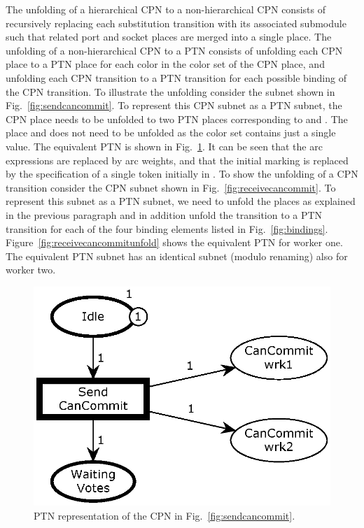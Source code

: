The unfolding of a hierarchical CPN to a non-hierarchical CPN consists
of recursively replacing each substitution transition with its
associated submodule such that related port and socket places are
merged into a single place. The unfolding of a non-hierarchical CPN to
a PTN consists of unfolding each CPN place to a PTN place for each
color in the color set of the CPN place, and unfolding each CPN
transition to a PTN transition for each possible binding of the CPN
transition.  To illustrate the unfolding consider the subnet shown in
Fig.~\ref{fig:sendcancommit}. To represent this CPN subnet as a PTN
subnet, the CPN place  needs to be unfolded to two
PTN places corresponding to  and . The
place  and  does not need to be
unfolded as the  color set contains just a single
value. The equivalent PTN is shown in
Fig.~\ref{fig:sendcancommitunfold}. It can be seen that the arc
expressions are replaced by arc weights, and that the initial marking
is replaced by the specification of a single token initially in
. To show the unfolding of a CPN transition consider the
CPN subnet shown in Fig.~\ref{fig:receivecancommit}. To represent this
subnet as a PTN subnet, we need to unfold the places as explained in
the previous paragraph and in addition unfold the transition
 to a PTN transition for each of the four
binding elements listed in
Fig.~\ref{fig:bindings}. Figure~\ref{fig:receivecancommitunfold} shows
the equivalent PTN for worker one. The equivalent PTN subnet has an
identical subnet (modulo renaming) also for worker two.



\begin{figure}[b]
\centering
\includegraphics[scale=.45]{figures/PTSendCanCommit.eps}
\caption{PTN representation of the CPN in Fig.~\ref{fig:sendcancommit}.}
\label{fig:sendcancommitunfold}
\end{figure}



